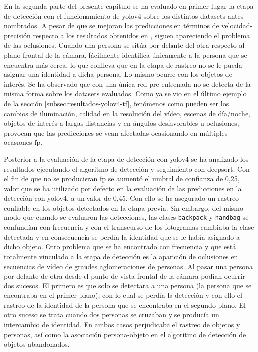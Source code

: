 En la segunda parte del presente capítulo se ha evaluado en primer lugar la etapa de detección con el funcionamiento de \gls{yolov4} sobre los distintos datasets antes nombrados. A pesar de que se mejoran las predicciones en términos de velocidad-precisión respecto a los resultados obtenidos en \cite{valdivieso2018}, siguen apareciendo el problema de las oclusiones. Cuando una persona se sitúa por delante del otra respecto al plano frontal de la cámara, fácilmente identifica únicamente a la persona que se encuentra más cerca, lo que conlleva que en la etapa de rastreo no se le pueda asignar una identidad a dicha persona. Lo mismo ocurre con los objetos de interés. Se ha observado que con una única red pre-entrenada no se detecta de la misma forma sobre los datasets evaluados. Como ya se vio en el último ejemplo de la sección \ref{subsec:resultados-yolov4-tf}, fenómenos como pueden ser los cambios de iluminación, calidad en la resolución del vídeo, escenas de día/noche, objetos de interés a largas distancias y en ángulos desfavorables u oclusiones, provocan que las predicciones se vean afectadas ocasionando en múltiples ocasiones \gls{fp}.

Posterior a la evaluación de la etapa de detección con \gls{yolov4} se ha analizado los resultados ejecutando el algoritmo de detección y seguimiento con \gls{deepsort}. Con el fin de que no se producieran \gls{fp} se aumentó el umbral de confianza de 0,25, valor que se ha utilizado por defecto en la evaluación de las predicciones en la detección con \gls{yolov4}, a un valor de 0,45. Con ello se ha asegurado un rastreo confiable en los objetos detectados en la etapa previa. Sin embargo, del mismo modo que cuando se evaluaron las detecciones, las clases \texttt{backpack} y \texttt{handbag} se confundían con frecuencia y con el transcurso de los fotogramas cambiaba la clase detectada y en consecuencia se perdía la identidad que se le había asignado a dicho objeto. Otro problema que se ha encontrado con frecuencia y que está totalmente vinculado a la etapa de detección es la aparición de oclusiones en secuencias de vídeo de grandes aglomeraciones de personas. Al pasar una persona por delante de otra desde el punto de vista frontal de la cámara podían ocurrir dos sucesos. El primero es que solo se detectara a una persona (la persona que se encontraba en el primer plano), con lo cual se perdía la detección y con ello el rastreo de la identidad de la persona que se encontraba en el segundo plano. El otro suceso se trata cuando dos personas se cruzaban y se producía un intercambio de identidad. En ambos casos perjudicaba el rastreo de objetos y personas, así como la asociación persona-objeto en el algoritmo de detección de objetos abandonados.

